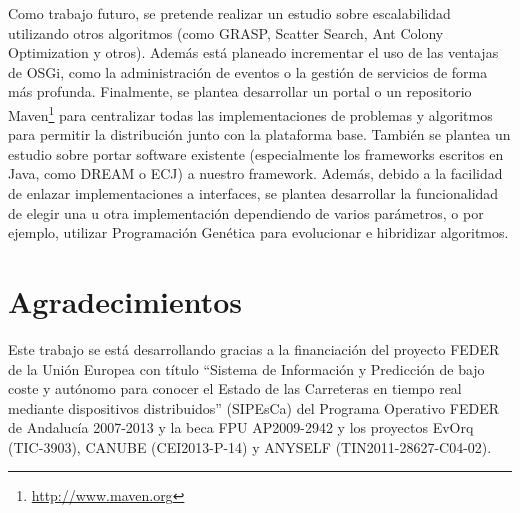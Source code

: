 \documentclass[runningheads]{llncs}
\begin{document}
Como trabajo futuro, se pretende realizar un estudio sobre escalabilidad utilizando otros algoritmos (como GRASP, Scatter Search, Ant Colony Optimization y otros). Además está planeado incrementar el uso de las ventajas de OSGi, como la administración de eventos o la gestión de servicios de forma más profunda. Finalmente, se plantea desarrollar un portal o un repositorio Maven\footnote{\url{http://www.maven.org}} para centralizar todas las implementaciones de problemas y algoritmos para permitir la distribución junto con la plataforma base. También se plantea un estudio sobre portar software existente (especialmente los frameworks escritos en Java, como DREAM o ECJ) a nuestro framework. Además, debido a la facilidad de enlazar implementaciones a interfaces, se plantea desarrollar la funcionalidad de elegir una u otra implementación dependiendo de varios parámetros, o por ejemplo, utilizar Programación Genética para evolucionar e hibridizar algoritmos.

\section*{Agradecimientos}



Este trabajo se está desarrollando gracias a la financiación del proyecto FEDER de la Unión Europea con título ``Sistema de Información y Predicción de bajo coste y autónomo para conocer el Estado de las Carreteras en tiempo real mediante dispositivos distribuidos'' (SIPEsCa) del Programa Operativo FEDER de Andalucía 2007-2013 y la beca FPU AP2009-2942 y los proyectos EvOrq (TIC-3903), CANUBE (CEI2013-P-14) y ANYSELF (TIN2011-28627-C04-02).
\begin{figure}
\begin{center} 
\end{center} 
\end{figure}


\end{document}
